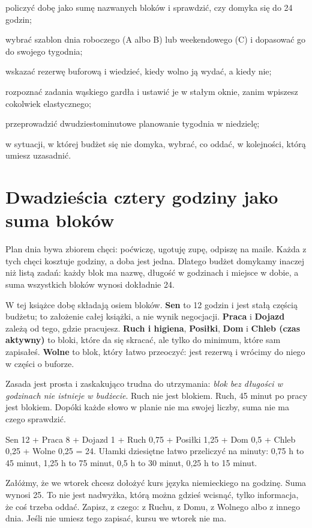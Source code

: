 
\begin{cele}
\item policzyć dobę jako sumę nazwanych bloków i sprawdzić, czy domyka się do 24 godzin;
\item wybrać szablon dnia roboczego (A albo B) lub weekendowego (C) i dopasować go do swojego tygodnia;
\item wskazać rezerwę buforową i wiedzieć, kiedy wolno ją wydać, a kiedy nie;
\item rozpoznać zadania wąskiego gardła i ustawić je w stałym oknie, zanim wpiszesz cokolwiek elastycznego;
\item przeprowadzić dwudziestominutowe planowanie tygodnia w niedzielę;
\item w sytuacji, w której budżet się nie domyka, wybrać, co oddać, w kolejności, którą umiesz uzasadnić.
\end{cele}

\section{Dwadzieścia cztery godziny jako suma bloków}

Plan dnia bywa zbiorem chęci: \glqq poćwiczę\grqq{}, \glqq ugotuję zupę\grqq{}, \glqq odpiszę na maile\grqq{}. Każda z tych chęci kosztuje godziny, a doba jest jedna. Dlatego budżet domykamy inaczej niż listą zadań: każdy blok ma nazwę, długość w godzinach i miejsce w dobie, a suma wszystkich bloków wynosi dokładnie 24.

W tej książce dobę składają osiem bloków. \textbf{Sen} to 12 godzin i jest stałą częścią budżetu; to założenie całej książki, a nie wynik negocjacji. \textbf{Praca} i \textbf{Dojazd} zależą od tego, gdzie pracujesz. \textbf{Ruch i higiena}, \textbf{Posiłki}, \textbf{Dom} i \textbf{Chleb (czas aktywny)} to bloki, które da się skracać, ale tylko do minimum, które sam zapisałeś. \textbf{Wolne} to blok, który łatwo przeoczyć: jest rezerwą i wrócimy do niego w części o buforze.

Zasada jest prosta i zaskakująco trudna do utrzymania: \emph{blok bez długości w godzinach nie istnieje w budżecie}. \glqq Ruch\grqq{} nie jest blokiem. \glqq Ruch, 45 minut po pracy\grqq{} jest blokiem. Dopóki każde słowo w planie nie ma swojej liczby, suma nie ma czego sprawdzić.

\begin{przyklad}
Sen 12 + Praca 8 + Dojazd 1 + Ruch 0,75 + Posiłki 1,25 + Dom 0,5 + Chleb 0,25 + Wolne 0,25 = 24.
Ułamki dziesiętne łatwo przeliczyć na minuty: 0,75 h to 45 minut, 1,25 h to 75 minut, 0,5 h to 30 minut, 0,25 h to 15 minut.

Załóżmy, że we wtorek chcesz dołożyć kurs języka niemieckiego na godzinę. Suma wynosi 25. To nie jest nadwyżka, którą można gdzieś wcisnąć, tylko informacja, że coś trzeba oddać. Zapisz, z czego: z Ruchu, z Domu, z Wolnego albo z innego dnia. Jeśli nie umiesz tego zapisać, kursu we wtorek nie ma.
\end{przyklad}

